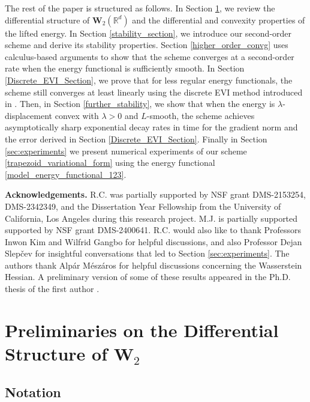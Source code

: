 \documentclass[11pt,a4paper]{amsart}
\newcommand{\1}{\mathds{1}}
\newcommand{\R}{{\mathbb R}}
\numberwithin{equation}{section}
\begin{document}
The rest of the paper is structured as follows. In Section \ref{prelim}, we review the differential structure of $\mathbf{W}_2(\R^d)$ and the differential and convexity properties of the lifted energy. In Section \ref{stability_section}, we introduce our second-order scheme and derive its stability properties. Section \ref{higher_order_convg} uses calculus-based arguments to show that the scheme converges at a second-order rate when the energy functional is sufficiently smooth. In Section \ref{Discrete_EVI_Section}, we prove that for less regular energy functionals, the scheme still converges at least linearly using the discrete EVI method introduced in \cite{ambrosio2005gradient}. Then, in Section \ref{further_stability}, we show that when the energy is $\lambda$-displacement convex with $\lambda > 0$ and $L$-smooth, the scheme achieves asymptotically sharp exponential decay rates in time for the gradient norm and the error derived in Section \ref{Discrete_EVI_Section}. Finally in Section \ref{sec:experiments} we present numerical experiments of our scheme \eqref{trapezoid_variational_form} using the energy functional \eqref{model_energy_functional_123}.





\smallskip

\noindent \textbf{Acknowledgements.} R.C. was partially supported by NSF grant DMS-2153254, DMS-2342349, and the Dissertation Year Fellowship from the University of California, Los Angeles during this research project.  M.J. is partially supported supported by NSF grant DMS-2400641.  R.C. would also like to thank Professors Inwon Kim and Wilfrid Gangbo for helpful discussions, and also Professor Dejan Slepčev for insightful conversations that led to Section \ref{sec:experiments}. The authors thank Alp\'{a}r M\'esz\'aros for helpful discussions concerning the Wasserstein Hessian. A preliminary version of some of these results appeared in the Ph.D. thesis of the first author \cite{chu2025optimal}.



\section{Preliminaries on the Differential Structure of \texorpdfstring{$\mathbf{W}_2$}{W2}}
 \label{prelim}

\subsection{Notation} 
\end{document}
